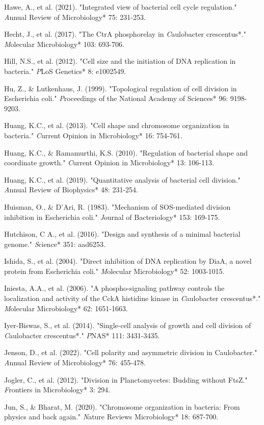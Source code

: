 \documentclass[11pt,a4paper]{article}
\begin{document}
Hawe, A., et al. (2021). "Integrated view of bacterial cell cycle regulation." \textit*Annual Review of Microbiology* 75: 231-253.

Hecht, J., et al. (2017). "The CtrA phosphorelay in \textit*Caulobacter crescentus*." \textit*Molecular Microbiology* 103: 693-706.

Hill, N.S., et al. (2012). "Cell size and the initiation of DNA replication in bacteria." \textit*PLoS Genetics* 8: e1002549.

Hu, Z., & Lutkenhaus, J. (1999). "Topological regulation of cell division in Escherichia coli." \textit*Proceedings of the National Academy of Sciences* 96: 9198-9203.

Huang, K.C., et al. (2013). "Cell shape and chromosome organization in bacteria." \textit*Current Opinion in Microbiology* 16: 754-761.

Huang, K.C., & Ramamurthi, K.S. (2010). "Regulation of bacterial shape and coordinate growth." \textit*Current Opinion in Microbiology* 13: 106-113.

Huang, K.C., et al. (2019). "Quantitative analysis of bacterial cell division." \textit*Annual Review of Biophysics* 48: 231-254.

Huisman, O., & D'Ari, R. (1983). "Mechanism of SOS-mediated division inhibition in Escherichia coli." \textit*Journal of Bacteriology* 153: 169-175.

Hutchison, C A., et al. (2016). "Design and synthesis of a minimal bacterial genome." \textit*Science* 351: aad6253.

Ishida, S., et al. (2004). "Direct inhibition of DNA replication by DiaA, a novel protein from Escherichia coli." \textit*Molecular Microbiology* 52: 1003-1015.

Iniesta, A.A., et al. (2006). "A phospho-signaling pathway controls the localization and activity of the CckA histidine kinase in \textit*Caulobacter crescentus*." \textit*Molecular Microbiology* 62: 1651-1663.

Iyer-Biswas, S., et al. (2014). "Single-cell analysis of growth and cell division of \textit*Caulobacter crescentus*." \textit*PNAS* 111: 3431-3435.

Jenson, D., et al. (2022). "Cell polarity and asymmetric division in Caulobacter." \textit*Annual Review of Microbiology* 76: 455-478.

Jogler, C., et al. (2012). "Division in Planctomycetes: Budding without FtsZ." \textit*Frontiers in Microbiology* 3: 294.

Jun, S., & Bharat, M. (2020). "Chromosome organization in bacteria: From physics and back again." \textit*Nature Reviews Microbiology* 18: 687-700.
\end{document}
